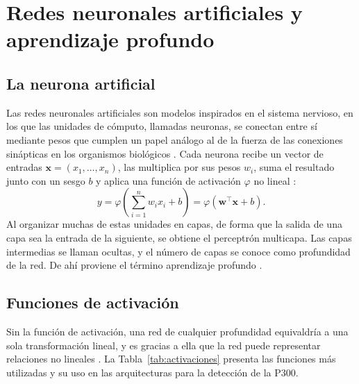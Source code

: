 \section[REDES NEURONALES ARTIFICIALES Y APRENDIZAJE PROFUNDO]{Redes neuronales artificiales y
aprendizaje profundo}

\subsection{La neurona artificial}

Las redes neuronales artificiales son modelos inspirados en el sistema nervioso, en los que las
unidades de cómputo, llamadas neuronas, se conectan entre sí mediante pesos que cumplen un papel
análogo al de la fuerza de las conexiones sinápticas en los organismos biológicos
\cite{aggarwal2018}. Cada neurona recibe un vector de entradas $\mathbf{x} = (x_1, \dots, x_n)$,
las multiplica por sus pesos $w_i$, suma el resultado junto con un sesgo $b$ y aplica una función
de activación $\varphi$ no lineal \cite{delbrio2002}:
\begin{equation}
y = \varphi\!\left(\sum_{i=1}^{n} w_i x_i + b\right) = \varphi\!\left(\mathbf{w}^{\top}\mathbf{x} + b\right).
\label{eq:neurona}
\end{equation}
Al organizar muchas de estas unidades en capas, de forma que
la salida de una capa sea la entrada de la siguiente, se obtiene el perceptrón multicapa. Las capas
intermedias se llaman ocultas, y el número de capas se conoce como profundidad de la red. De ahí
proviene el término aprendizaje profundo \cite{goodfellow2016}.

\subsection{Funciones de activación}

Sin la función de activación, una red de cualquier profundidad equivaldría a una sola
transformación lineal, y es gracias a ella que la red puede representar relaciones no
lineales \cite{goodfellow2016}. La Tabla~\ref{tab:activaciones} presenta las funciones más
utilizadas y su uso en las arquitecturas para la detección de la P300.

